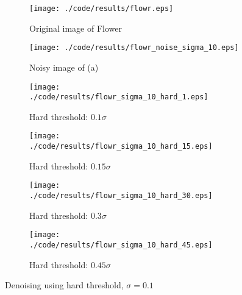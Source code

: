 \documentclass[journal,comsoc]{IEEEtran}
\begin{document}
\begin{figure}[!hbt]
  \centering
  \begin{subfigure}{.25\textwidth}
    \centering
    \texttt{[image: ./code/results/flowr.eps]}
    \caption{Original image of Flower}
    \label{subfig:original-image-of-flower}
  \end{subfigure}%
  \begin{subfigure}{.25\textwidth}
    \centering
    \texttt{[image: ./code/results/flowr\_noise\_sigma\_10.eps]}
    \caption{Noisy image of (a)}
    \label{subfig:sigma-10-noisy-image-of-a}
  \end{subfigure}

  \begin{subfigure}{0.25\textwidth}
    \centering{}
    \texttt{[image: ./code/results/flowr\_sigma\_10\_hard\_1.eps]}
    \caption{Hard threshold: $0.1\sigma$}
  \end{subfigure}%
  \begin{subfigure}{.25\textwidth}
    \centering{}
    \texttt{[image: ./code/results/flowr\_sigma\_10\_hard\_15.eps]}
    \caption{Hard threshold: $0.15\sigma$}
  \end{subfigure}

  \begin{subfigure}{0.25\textwidth}
    \centering{}
    \texttt{[image: ./code/results/flowr\_sigma\_10\_hard\_30.eps]}
    \caption{Hard threshold: $0.3\sigma$}
  \end{subfigure}%
  \begin{subfigure}{.25\textwidth}
    \centering{}
    \texttt{[image: ./code/results/flowr\_sigma\_10\_hard\_45.eps]}
    \caption{Hard threshold: $0.45\sigma$}
  \end{subfigure}
  
  \caption{Denoising using hard threshold, $\sigma=0.1$}
  \label{fig:flower-sigma-10-hard-threshold}
\end{figure}
\end{document}
